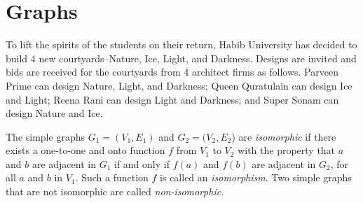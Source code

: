 \documentclass[addpoints]{exam}
\begin{document}
\begin{questions}
\begin{solution}
  \end{solution}
  
  \section*{Graphs}
  
\question To lift the spirits of the students on their return, Habib University has decided to build 4 new courtyards--Nature, Ice, Light, and Darkness. Designs are invited and bids are received for the courtyards from 4 architect firms as follows. Parveen Prime can design Nature, Light, and Darkness; Queen Quratulain can design Ice and Light; Reena Rani can design Light and Darkness; and Super Sonam can design Nature and Ice.
  
\question  The simple graphs $G_1 = (V_1,E_1)$ and $G_2 = (V_2,E_2$) are \textit{isomorphic} if there exists a one-to-one and onto function $f$ from $V_1$ to $V_2$ with the property that $a$ and $b$ are adjacent in $G_1$ if and only if $f(a)$ and $f(b)$ are adjacent in $G_2$, for all $a$ and $b$ in $V_1$. Such a function $f$ is called an \textit{isomorphism}. Two simple graphs that are not isomorphic are called \textit{non-isomorphic}.


\end{questions}
\end{document}
